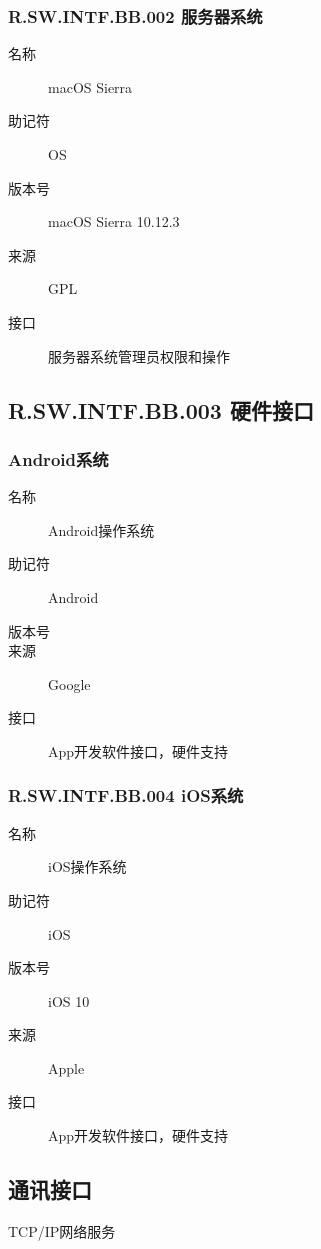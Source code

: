     \subsubsection{R.SW.INTF.BB.002 服务器系统}
	   \begin{center}\begin{description}
      \item[名称] macOS Sierra
      \item[助记符] OS
      \item[版本号] macOS Sierra 10.12.3
	     \item[来源] GPL
	      \item[接口] 服务器系统管理员权限和操作
	   \end{description}\end{center}

     \subsection{R.SW.INTF.BB.003 硬件接口}
     \subsubsection{Android系统}
	    \begin{center}\begin{description}
      \item[名称] Android操作系统
      \item[助记符] Android
      \item[版本号]
	\item[来源] Google
	\item[接口] App开发软件接口，硬件支持
	\end{description}\end{center}

    \subsubsection{R.SW.INTF.BB.004 iOS系统}
	\begin{center}\begin{description}
      \item[名称] iOS操作系统
      \item[助记符] iOS
      \item[版本号] iOS 10
	\item[来源] Apple
	\item[接口] App开发软件接口，硬件支持
	\end{description}\end{center}

  \subsection{通讯接口}
	TCP/IP网络服务

